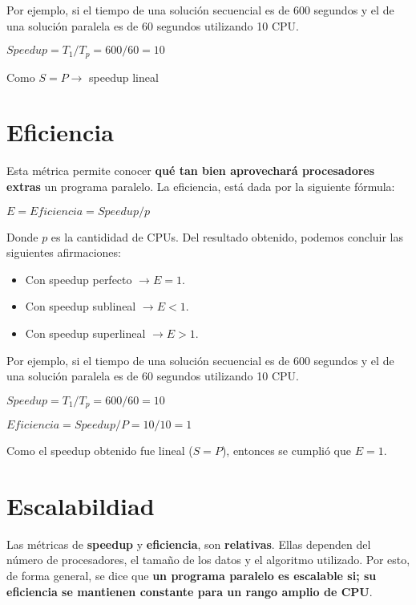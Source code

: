 \documentclass[a4paper, 10pt]{report}
\begin{document}
Por ejemplo, si el tiempo de una solución secuencial es de 600 segundos y el de una solución paralela es de 60 segundos utilizando 10 CPU.

\begin{center}
    $Speedup = T_1 / T_p = 600 / 60 = 10$

    Como $S = P \rightarrow$ speedup lineal
\end{center}

\section{Eficiencia}

Esta métrica permite conocer \textbf{qué tan bien aprovechará procesadores extras} un programa paralelo. La eficiencia, está dada por la siguiente fórmula:

\begin{center}
    $E = Eficiencia = Speedup / p$
\end{center}

Donde $p$ es la cantididad de CPUs. Del resultado obtenido, podemos concluir las siguientes afirmaciones:

\begin{itemize}
    \item Con speedup perfecto $\rightarrow E = 1$.
    \item Con speedup sublineal $\rightarrow E < 1$.
    \item Con speedup superlineal $\rightarrow E > 1$.
\end{itemize}

Por ejemplo, si el tiempo de una solución secuencial es de 600 segundos y el de una solución paralela es de 60 segundos utilizando 10 CPU.

\begin{center}
    $Speedup = T_1 / T_p = 600 / 60 = 10$
\end{center}
\begin{center}
    $Eficiencia = Speedup / P = 10 / 10 = 1$
\end{center}

Como el speedup obtenido fue lineal ($S=P$), entonces se cumplió que $E=1$.

\section{Escalabildiad}

Las métricas de \textbf{speedup} y \textbf{eficiencia}, son \textbf{relativas}. Ellas dependen del número de procesadores, el tamaño de los datos y el algoritmo utilizado. Por esto, de forma general, se dice que \textbf{un programa paralelo es escalable si; su eficiencia se mantienen constante para un rango amplio de CPU}.
\end{document}
